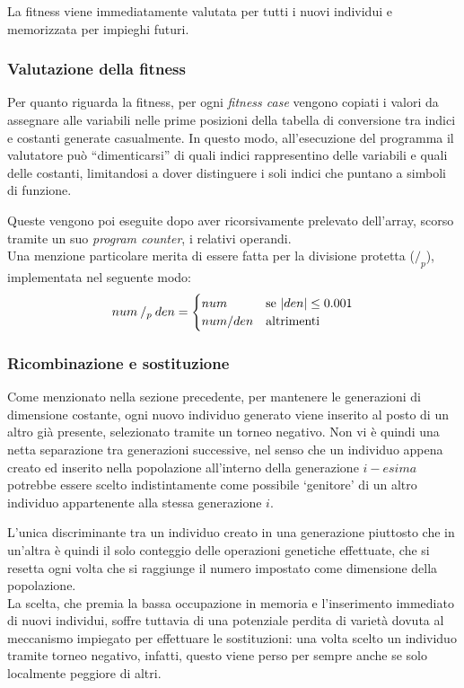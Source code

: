 \documentclass{../llncs}
\DeclarePairedDelimiter{\abs}{\lvert}{\rvert}
\begin{document}
La fitness viene immediatamente valutata per tutti i nuovi individui e memorizzata per impieghi futuri.

\subsubsection{Valutazione della fitness}
Per quanto riguarda la fitness, per ogni \emph{fitness case} vengono copiati i valori da assegnare alle variabili nelle prime posizioni della tabella di conversione tra indici e costanti generate casualmente. In questo modo, all'esecuzione del programma il valutatore può ``dimenticarsi'' di quali indici rappresentino delle variabili e quali delle costanti, limitandosi a dover distinguere i soli indici che puntano a simboli di funzione.

Queste vengono poi eseguite dopo aver ricorsivamente prelevato dell'array, scorso tramite un suo \emph{program counter}, i relativi operandi.\\

Una menzione particolare merita di essere fatta per la divisione protetta ($/_p$), implementata nel seguente modo:
\[
num \: /_p \: den =
\begin{cases}
num & \text{se $\abs{den}\le0.001$} \\
num/den & \text{altrimenti}
\end{cases}
\]

\subsubsection{Ricombinazione e sostituzione}
Come menzionato nella sezione precedente, per mantenere le generazioni di dimensione costante, ogni nuovo individuo generato viene inserito al posto di un altro già presente, selezionato tramite un torneo negativo. Non vi è quindi una netta separazione tra generazioni successive, nel senso che un individuo appena creato ed inserito nella popolazione all'interno della generazione $i-esima$ potrebbe essere scelto indistintamente come possibile `genitore' di un altro individuo appartenente alla stessa generazione $i$.

L'unica discriminante tra un individuo creato in una generazione piuttosto che in un'altra è quindi il solo conteggio delle operazioni genetiche effettuate, che si resetta ogni volta che si raggiunge il numero impostato come dimensione della popolazione.\\

La scelta, che premia la bassa occupazione in memoria e l'inserimento immediato di nuovi individui, soffre tuttavia di una potenziale perdita di varietà dovuta al meccanismo impiegato per effettuare le sostituzioni: una volta scelto un individuo tramite torneo negativo, infatti, questo viene perso per sempre anche se solo localmente peggiore di altri.
\end{document}
